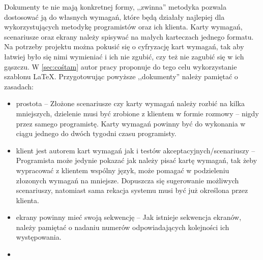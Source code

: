 Dokumenty te nie mają konkretnej formy, ,,zwinna'' metodyka pozwala dostosować ją do własnych wymagań, które będą działały najlepiej dla wykorzystujących metodykę programistów oraz ich klienta. Karty wymagań, scenariusze oraz ekrany należy spisywać na małych karteczach jednego formatu. Na potrzeby projektu można pokusić się o cyfryzację kart wymagań, tak aby łatwiej było się nimi wymieniać i ich nie zgubić, czy też nie zagubić się w ich gąszczu. W \ref{sec:cośtam} autor pracy proponuje do tego celu wykorzystanie szablonu \LaTeX. Przygotowując powyższe ,,dokumenty'' należy pamiętać o zasadach:
\begin{itemize}
    \item prostota -- Złożone scenariusze czy karty wymagań należy rozbić na kilka mniejszych, dzielenie musi być zrobione z klientem w formie rozmowy -- nigdy przez samego programistę. Karty wymagań powinny być do wykonania w ciągu jednego do dwóch tygodni czasu programisty.
    \item klient jest autorem kart wymagań jak i testów akceptacyjnych/scenariuszy -- Programista może jedynie pokazać jak należy pisać kartę wymagań, tak żeby wypracować z klientem wspólny język, może pomagać w podzieleniu złozonych wymagań na mniejsze. Dopuszcza się sugerowanie możliwych scenariuszy, natomiast sama rekacja systemu musi być już określona przez klienta.
    \item ekrany powinny mieć swoją sekwencję -- Jak istnieje sekwencja ekranów, należy pamiętać o nadaniu numerów odpowiadających kolejności ich występowania.
    \item 
\end{itemize}

\newpage

